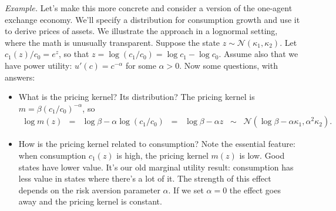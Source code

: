 \documentclass[11pt]{article}
\begin{document}
{\it Example.\/}
Let's make this more concrete and consider a version of the one-agent exchange economy.
We'll specify a distribution for consumption growth
and use it to derive prices of assets.
We illustrate the approach in a lognormal setting, where the math is unusually transparent.
Suppose the state $z \sim \mathcal{N}(\kappa_1,\kappa_2)$.
Let $c_1(z)/c_0 = e^z$, so that $z = \log (c_1/c_0) = \log c_1 - \log c_0$.
Assume also that we have power utility:
$u'(c) = c^{-\alpha}$ for some $\alpha > 0$.
Now some questions, with answers:
\begin{itemize}
\item What is the pricing kernel?  Its distribution?
The pricing kernel is $m = \beta (c_1/c_0)^{-\alpha}$, so
\begin{eqnarray*}
    \log m(z) &=& \log \beta - \alpha \log (c_1/c_0)
            \;\;=\;\; \log \beta - \alpha z
            \;\;\sim \;\; \mathcal{N}(\log \beta - \alpha \kappa_1, \alpha^2 \kappa_2) .
\end{eqnarray*}


\item How is the pricing kernel related to consumption?
Note the essential feature:  when consumption $c_1(z)$ is high,
the pricing kernel $m(z)$ is low.
Good states have lower value.
It's our old marginal utility result:  consumption has less value in states where there's a lot of it.
The strength of this effect depends on the risk aversion parameter $\alpha$.
If we set $\alpha = 0$ the effect goes away and the pricing kernel is constant.


\end{itemize}
\end{document}
